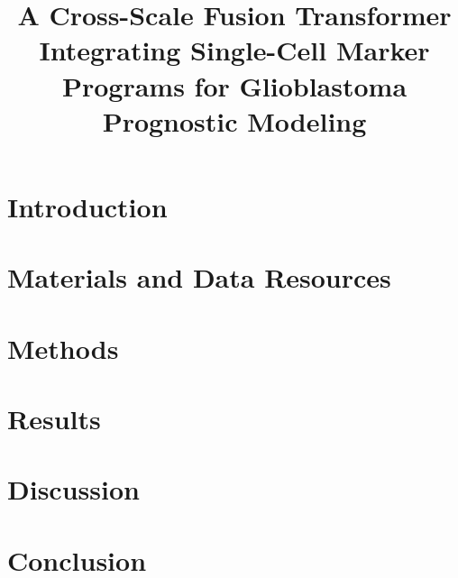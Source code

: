 \documentclass[conference]{IEEEtran}
\title{A Cross-Scale Fusion Transformer Integrating Single-Cell Marker Programs for Glioblastoma Prognostic Modeling}
\author{
\IEEEauthorblockN{Anonymous Authors}
\IEEEauthorblockA{IEEE-ICMLC 2026 Submission}
}
\begin{document}
\maketitle

\begin{abstract}

\end{abstract}

\section{Introduction}


\section{Materials and Data Resources}


\section{Methods}


\section{Results}


\section{Discussion}


\section{Conclusion}




\end{document}
